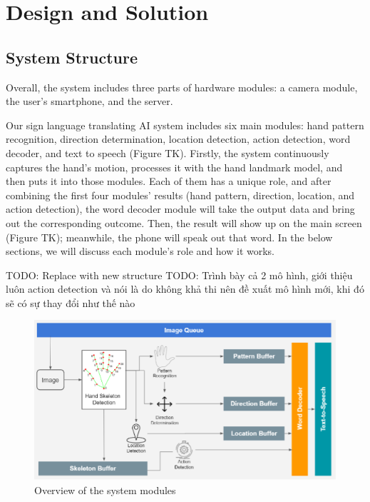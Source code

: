\chapter{Design and Solution}

\section{System Structure}
Overall, the system includes three parts of hardware modules: a camera module, the user's smartphone, and the server.

Our sign language translating AI system includes six main modules: hand pattern recognition, direction determination, location detection, action detection, word decoder, and text to speech (Figure TK). Firstly, the system continuously captures the hand's motion, processes it with the hand landmark model, and then puts it into those modules. Each of them has a unique role, and after combining the first four modules' results (hand pattern, direction, location, and action detection), the word decoder module will take the output data and bring out the corresponding outcome. Then, the result will show up on the main screen (Figure TK); meanwhile, the phone will speak out that word. In the below sections, we will discuss each module's role and how it works.

TODO: Replace with new structure
TODO: Trình bày cả 2 mô hình, giới thiệu luôn action detection và nói là do không khả thi nên đề xuất mô hình mới, khi đó sẽ có sự thay đổi như thế nào 

\begin{figure}[H]
  \centering
  \includegraphics[width=\textwidth]{img/Chap4/OverviewOfTheSystemModules.png}
  \caption{Overview of the system modules}
  \label{fig:Chap4-OverviewOfTheSystemModules}
\end{figure}

